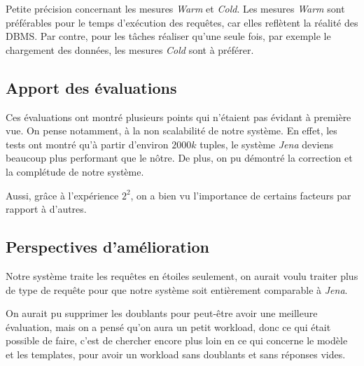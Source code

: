 \documentclass[12pt,titlepage]{article}
\begin{document}
Petite précision concernant les mesures \textit{Warm} et \textit{Cold}. Les mesures \textit{Warm} sont préférables pour le temps d'exécution des requêtes, car elles reflètent la réalité des DBMS. Par contre, pour les tâches réaliser qu'une seule fois, par exemple le chargement des données, les mesures \textit{Cold} sont à préférer.

\subsection{Apport des évaluations} 

Ces évaluations ont montré plusieurs points qui n'étaient pas évidant à première vue. On pense notamment, à la non scalabilité de notre système. En effet, les tests ont montré qu'à partir d'environ $2000k$ tuples, le système \textit{Jena} deviens beaucoup plus performant que le nôtre. De plus, on pu démontré la correction et la complétude de notre système.

Aussi, grâce à l'expérience $2^2$, on a bien vu l'importance de certains facteurs par rapport à d'autres.

\subsection{Perspectives d'amélioration}

Notre système traite les requêtes en étoiles seulement, on aurait voulu traiter plus de type de requête pour que notre système soit entièrement comparable à \textit{Jena}.

On aurait pu supprimer les doublants pour peut-être avoir une meilleure évaluation, mais on a pensé qu'on aura un petit workload, donc ce qui était possible de faire, c'est de chercher encore plus loin en ce qui concerne le modèle et les templates, pour avoir un workload sans doublants et sans réponses vides. 
\end{document}
